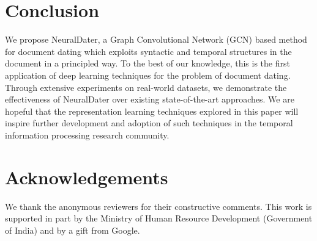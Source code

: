 \documentclass[11pt,a4paper]{article}
\newcommand{\method}{NeuralDater}
\begin{document}
%
 \section{Conclusion}
\label{sec:conclusion}

We propose \method{}, a Graph Convolutional Network (GCN) based method for document dating which exploits syntactic and temporal structures in the document in a principled way. To the best of our knowledge, this is the first application of deep learning techniques for the problem of document dating. Through extensive experiments on real-world datasets, we demonstrate the effectiveness of \method{} over existing state-of-the-art approaches. 
We are hopeful that the representation learning techniques explored in this paper will inspire further development and adoption of such techniques in the temporal information processing research community. 
\section*{Acknowledgements}
We thank the anonymous reviewers for their constructive comments. This work is supported in part by the Ministry of Human Resource Development (Government of India) and by a gift from Google.



\balance

\end{document}
